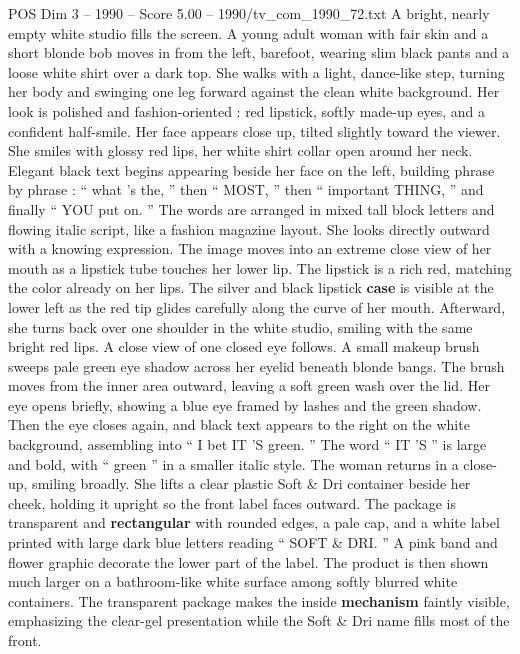 \begin{textsample}{POS Dim 3 – 1990 – Score 5.00 – 1990/tv\_com\_1990\_72.txt}  \label{ex:f3_pos_057}
A bright, nearly empty white studio fills the screen.
A young adult woman with fair skin and a short blonde bob moves in from the left, barefoot, wearing slim black pants and a loose white shirt over a dark top.
She walks with a light, dance-like step, turning her body and swinging one leg forward against the clean white background.
Her look is polished and fashion-oriented : red lipstick, softly made-up eyes, and a confident half-smile.
Her face appears close up, tilted slightly toward the viewer.
She smiles with glossy red lips, her white shirt collar open around her neck.
Elegant black text begins appearing beside her face on the left, building phrase by phrase : “ what ’s the, ” then “ MOST, ” then “ important THING, ” and finally “ YOU put on. ” The words are arranged in mixed tall block letters and flowing italic script, like a fashion magazine layout.
She looks directly outward with a knowing expression.
The image moves into an extreme close view of her mouth as a lipstick tube touches her lower lip.
The lipstick is a rich red, matching the color already on her lips.
The silver and black lipstick \textbf{case} is visible at the lower left as the red tip glides carefully along the curve of her mouth.
Afterward, she turns back over one shoulder in the white studio, smiling with the same bright red lips.
A close view of one closed eye follows.
A small makeup brush sweeps pale green eye shadow across her eyelid beneath blonde bangs.
The brush moves from the inner area outward, leaving a soft green wash over the lid.
Her eye opens briefly, showing a blue eye framed by lashes and the green shadow.
Then the eye closes again, and black text appears to the right on the white background, assembling into “ I bet IT ’S green. ” The word “ IT ’S ” is large and bold, with “ green ” in a smaller italic style.
The woman returns in a close-up, smiling broadly.
She lifts a clear plastic Soft \& Dri container beside her cheek, holding it upright so the front label faces outward.
The package is transparent and \textbf{rectangular} with rounded edges, a pale cap, and a white label printed with large dark blue letters reading “ SOFT \& DRI. ” A pink band and flower graphic decorate the lower part of the label.
The product is then shown much larger on a bathroom-like white surface among softly blurred white containers.
The transparent package makes the inside \textbf{mechanism} faintly visible, emphasizing the clear-gel presentation while the Soft \& Dri name fills most of the front.

\end{textsample}
